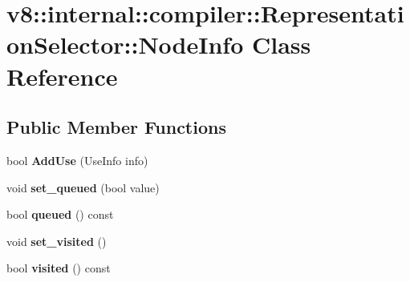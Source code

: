 \hypertarget{classv8_1_1internal_1_1compiler_1_1_representation_selector_1_1_node_info}{}\section{v8\+:\+:internal\+:\+:compiler\+:\+:Representation\+Selector\+:\+:Node\+Info Class Reference}
\label{classv8_1_1internal_1_1compiler_1_1_representation_selector_1_1_node_info}
\subsection*{Public Member Functions}
\begin{DoxyCompactItemize}
\item 
bool {\bfseries Add\+Use} (Use\+Info info)\hypertarget{classv8_1_1internal_1_1compiler_1_1_representation_selector_1_1_node_info_a6906bb244f8616e5379d1d4395f3afab}{}\label{classv8_1_1internal_1_1compiler_1_1_representation_selector_1_1_node_info_a6906bb244f8616e5379d1d4395f3afab}

\item 
void {\bfseries set\+\_\+queued} (bool value)\hypertarget{classv8_1_1internal_1_1compiler_1_1_representation_selector_1_1_node_info_af6f4cdcd722633c81ca46c8a0f17c812}{}\label{classv8_1_1internal_1_1compiler_1_1_representation_selector_1_1_node_info_af6f4cdcd722633c81ca46c8a0f17c812}

\item 
bool {\bfseries queued} () const \hypertarget{classv8_1_1internal_1_1compiler_1_1_representation_selector_1_1_node_info_a4b51fc3f9772d33b53d8f8ec3807d9cd}{}\label{classv8_1_1internal_1_1compiler_1_1_representation_selector_1_1_node_info_a4b51fc3f9772d33b53d8f8ec3807d9cd}

\item 
void {\bfseries set\+\_\+visited} ()\hypertarget{classv8_1_1internal_1_1compiler_1_1_representation_selector_1_1_node_info_a31bf5b8e667f2ada7b7f0c1c3e2407f0}{}\label{classv8_1_1internal_1_1compiler_1_1_representation_selector_1_1_node_info_a31bf5b8e667f2ada7b7f0c1c3e2407f0}

\item 
bool {\bfseries visited} () const \hypertarget{classv8_1_1internal_1_1compiler_1_1_representation_selector_1_1_node_info_aa05b6e3d9cf60d4bb47054648662330b}{}\label{classv8_1_1internal_1_1compiler_1_1_representation_selector_1_1_node_info_aa05b6e3d9cf60d4bb47054648662330b}


\end{DoxyCompactItemize}
